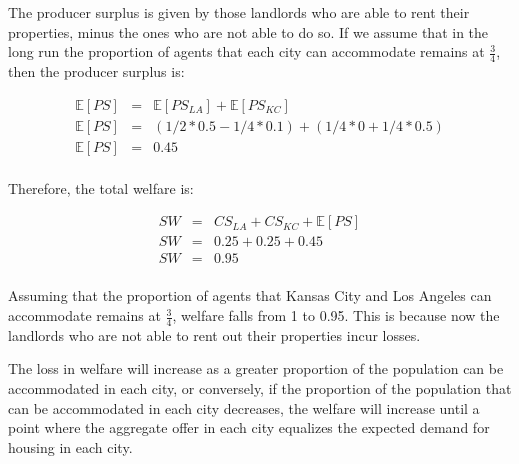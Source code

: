 The producer surplus is given by those landlords who are able to rent their properties, minus the ones who are not able to do so. If we assume that in the long run the proportion of agents that each city can accommodate remains at \( \frac{3}{4} \), then the producer surplus is:

\begin{eqnarray*}
    \mathbb{E}[PS] &=& \mathbb{E}[PS_{LA}] + \mathbb{E}[PS_{KC}]\\
    \mathbb{E}[PS] &=& (1/2*0.5 - 1/4*0.1) + (1/4 * 0 + 1/4*0.5)\\
    \mathbb{E}[PS] &=& 0.45\\
\end{eqnarray*}

Therefore, the total welfare is:

\begin{eqnarray*}
    SW &=& CS_{LA} + CS_{KC} + \mathbb{E}[PS]\\
    SW &=& 0.25 + 0.25 + 0.45\\
    SW &=& 0.95\\
\end{eqnarray*}

\begin{myanswerbox}
    Assuming that the proportion of agents that Kansas City and Los Angeles can accommodate remains at \( \frac{3}{4} \), welfare falls from 1 to 0.95. This is because now the landlords who are not able to rent out their properties incur losses.

    The loss in welfare will increase as a greater proportion of the population can be accommodated in each city, or conversely, if the proportion of the population that can be accommodated in each city decreases, the welfare will increase until a point where the aggregate offer in each city equalizes the expected demand for housing in each city.
\end{myanswerbox}

